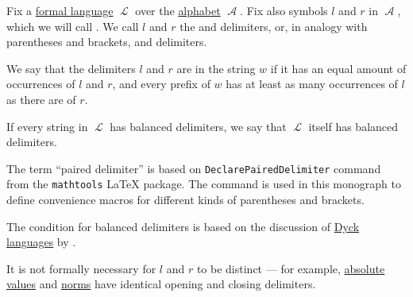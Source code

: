 \begin{definition}\label{def:paired_delimiters}\mimprovised
  Fix a \hyperref[def:formal_language/language]{formal language} \( \mscrL \) over the \hyperref[def:formal_language/alphabet]{alphabet} \( \mscrA \). Fix also symbols \( l \) and \( r \) in \( \mscrA \), which we will call . We call \( l \) and \( r \) the  and  delimiters, or, in analogy with parentheses and brackets,  and  delimiters.

  We say that the delimiters \( l \) and \( r \) are  in the string \( w \) if it has an equal amount of occurrences of \( l \) and \( r \), and every prefix of \( w \) has at least as many occurrences of \( l \) as there are of \( r \).

  If every string in \( \mscrL \) has balanced delimiters, we say that \( \mscrL \) itself has balanced delimiters.
\end{definition}
\begin{comments}
  \item The term \enquote{paired delimiter} is based on \texttt{DeclarePairedDelimiter} command from the \texttt{mathtools} \LaTeX{} package. The command is used in this monograph to define convenience macros for different kinds of parentheses and brackets.

  \item The condition for balanced delimiters is based on the discussion of \hyperref[def:dyck_language]{Dyck languages} by \textcite[example 6.6.6]{Stanley2023EnumerativeCombinatoricsVol2}.

  \item It is not formally necessary for \( l \) and \( r \) to be distinct --- for example, \hyperref[def:absolute_value]{absolute values} and \hyperref[def:norm]{norms} have identical opening and closing delimiters.
\end{comments}

